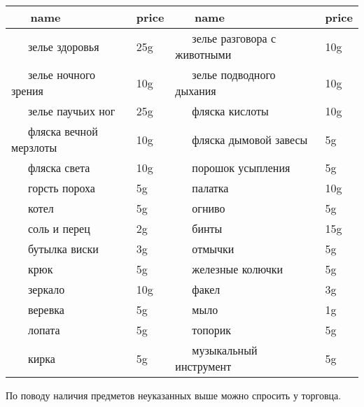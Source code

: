 \documentclass[a5paper,11pt]{book}
\begin{document}
\noindent
{}
\setlength\tabcolsep{0pt}
\setlength\LTleft{0pt}
\setlength\LTright{0pt}
\begin{longtable}{p{}P{0.1\textwidth}p{0.4\textwidth}P{0.1\textwidth}}
  \textbf{\ \ \ name}
  & \textbf{price}
  & \textbf{\ \ \ name}
  & \textbf{price}
  \\
  \hline
  \ \ \ зелье здоровья                  &  25g &
  \ \ \ зелье разговора с животными     &  10g \\
  \ \ \ зелье ночного зрения            &  10g &
  \ \ \ зелье подводного дыхания        &  10g \\
  \ \ \ зелье паучьих ног               &  25g &
  \ \ \ фляска кислоты                  &  10g \\
  \ \ \ фляска вечной мерзлоты          &  10g &
  \ \ \ фляска дымовой завесы           &   5g \\
  \ \ \ фляска света                    &  10g &
  \ \ \ порошок усыпления               &   5g \\
  \ \ \ горсть пороха                   &   5g &
  \ \ \ палатка                         &  10g \\
  \ \ \ котел                           &   5g &
  \ \ \ огниво                          &   5g \\
  \ \ \ соль и перец                    &   2g &
  \ \ \ бинты                           &  15g \\
  \ \ \ бутылка виски                   &   3g &
  \ \ \ отмычки                         &   5g \\
  \ \ \ крюк                            &   5g &
  \ \ \ железные колючки                &   5g \\
  \ \ \ зеркало                         &  10g &
  \ \ \ факел                           &   3g \\
  \ \ \ веревка                         &   5g &
  \ \ \ мыло                            &   1g \\
  \ \ \ лопата                          &   5g &
  \ \ \ топорик                         &   5g \\
  \ \ \ кирка                           &   5g &
  \ \ \ музыкальный инструмент          &   5g
  \\

\end{longtable}

\begin{ru}
По поводу наличия предметов неуказанных выше можно спросить у торговца.
\end{ru}
\end{document}
